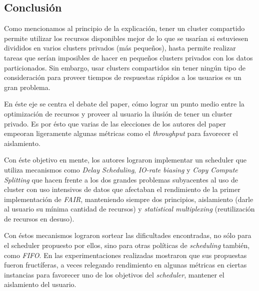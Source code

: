 \documentclass[a4paper]{article}
\begin{document}
\subsection{Conclusión}
Como mencionamos al principio de la explicación, tener un cluster compartido
permite utilizar los recursos disponibles mejor de lo que se usarían si
estuviesen divididos en varios clusters privados (más pequeños), hasta permite
realizar tareas que serían imposibles de hacer en pequeños clusters privados
con los datos particionados. Sin embargo, usar clusters compartidos sin tener
ningún tipo de consideración para proveer tiempos de respuestas rápidos a los
usuarios es un gran problema.

En éste eje se centra el debate del paper, cómo lograr un punto medio entre
la optimización de recursos y proveer al usuario la ilusión de tener un
cluster privado. Es por ésto que varias de las elecciones de los autores del
paper empeoran ligeramente algunas métricas como el \textit{throughput} para 
favorecer el aislamiento.

Con éste objetivo en mente, los autores lograron implementar un scheduler que
utiliza mecanismos como \textit{Delay Scheduling}, \textit{IO-rate biasing} y
\textit{Copy Compute Splitting} que hacen frente a los dos grandes problemas
subyacentes al uso de cluster con uso intensivos de datos que afectaban el
rendimiento de la primer implementación de \textit{FAIR}, manteniendo siempre
dos principios, aislamiento (darle al usuario su mínima cantidad de recursos) y
\textit{statistical multiplexing} (reutilización de recursos en desuso).

Con éstos mecanismos lograron sortear las dificultades encontradas, no sólo
para el scheduler propuesto por ellos, sino para otras políticas de
\textit{scheduling} también, como \textit{FIFO}. En las experimentaciones
realizadas mostraron que sus propuestas fueron fructíferas, a veces relegando
rendimiento en algunas métricas en ciertas instancias para favorecer uno de los
objetivos del \textit{scheduler}, mantener el aislamiento del usuario.
\end{document}
